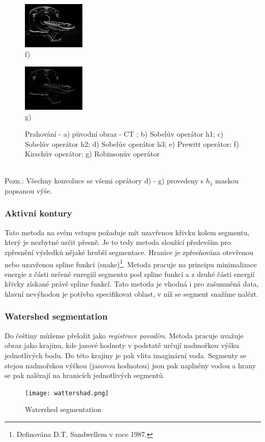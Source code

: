 \documentclass{thesis}%
\begin{document}
\begin{figure}[htp!]
\begin{minipage}[c]{0.3\textwidth}
	\centering\includegraphics[width=3cm]{convolution/Kirsch1.jpg}\\
     f)
   \end{minipage}
    \begin{minipage}[c]{0.3\textwidth}
	\centering\includegraphics[width=3cm]{convolution/Robinson1.jpg}\\
     g)
   \end{minipage}

	\caption[Konvoluce s různými maskami]{Prahování - a) původní obraz - CT ; b) Sobelův operátor h1; c)  Sobelův operátor h2; d) Sobelův operátor h3; e) Prewitt operátor; f) Kirschův operátor; g) Robinsonův operátor}
\end{figure}\\
Pozn.: Všechny konvoluce se všemi oprátory d) - g) provedeny s $h_1$ maskou popsanou výše.
\subsubsection{Aktivní kontury}
Tato metoda na svém vstupu požaduje mít uzavřenou křivku kolem segmentu, který je nezbytné určit přesně. Je to tedy metoda sloužící především pro zpřesnění výsledků nějaké hrubší segmentace. Hranice je zpřesňována otevřenou nebo uzavřenou spline funkcí (snake)\footnote[14]{Definována D.T. Sandwellem v roce 1987.}. Metoda pracuje na principu minimalizace energie z části určené enregiíí segmentu pod spline funkcí a z druhé části energií křivky získané právě spline funkcí. Tato metoda je vhodná i pro zašumněná data, hlavní nevýhodou je potřeba specifikovat oblast, v níž se segment snažíme nalézt.

\subsubsection{Watershed segmentation}
Do češtiny můžeme přeložit jako \textit{registrace povodím}. Metoda pracuje uvažuje obraz jako krajinu, kde jasové hodnoty v podstatě určují nadmořkou výšku jednotlivých bodu. Do této krajiny je pak vlita imaginární voda. Segmenty se stejou nadmořskou výškou (jasovou hodnotou) jsou pak naplněny vodou a hrany se pak nalézají na hranicích jednotlivých segmentů.
 \begin{figure}[htp!]
  
	\centering\texttt{[image: wattershad.png]}\\
	\caption[Watershed segmentation]{Watershed segmentation}
\end{figure}
\end{document}
